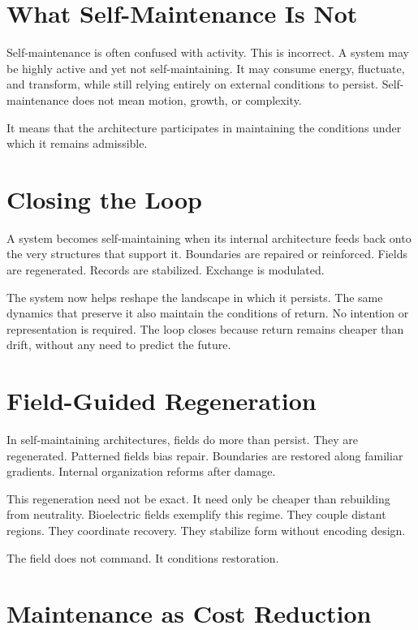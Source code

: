 \documentclass[11pt,twoside,openright]{book}
\begin{document}
\section*{What Self-Maintenance Is Not}

Self-maintenance is often confused with activity. This is incorrect. A system may be highly active and yet not self-maintaining. It may consume energy, fluctuate, and transform, while still relying entirely on external conditions to persist. Self-maintenance does not mean motion, growth, or complexity.

It means that the architecture participates in maintaining the conditions under which it remains admissible.

\section*{Closing the Loop}

A system becomes self-maintaining when its internal architecture feeds back onto the very structures that support it. Boundaries are repaired or reinforced. Fields are regenerated. Records are stabilized. Exchange is modulated.

The system now helps reshape the landscape in which it persists. The same dynamics that preserve it also maintain the conditions of return. No intention or representation is required. The loop closes because return remains cheaper than drift, without any need to predict the future.

\section*{Field-Guided Regeneration}

In self-maintaining architectures, fields do more than persist. They are regenerated. Patterned fields bias repair. Boundaries are restored along familiar gradients. Internal organization reforms after damage.

This regeneration need not be exact. It need only be cheaper than rebuilding from neutrality. Bioelectric fields exemplify this regime. They couple distant regions. They coordinate recovery. They stabilize form without encoding design.

The field does not command. It conditions restoration.

\section*{Maintenance as Cost Reduction}
\end{document}

